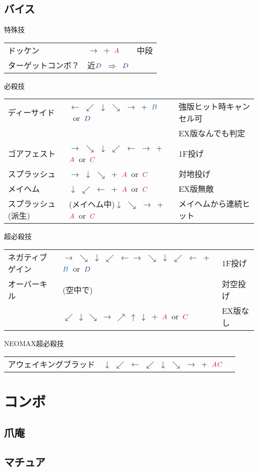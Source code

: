 \documentclass[a4j,11pt]{jarticle}
\def\A{$\textcolor{Acolor}{A}$}
\def\C{$\textcolor{Ccolor}{C}$}
\def\B{$\textcolor{Bcolor}{B}$}
\def\D{$\textcolor{Dcolor}{D}$}
\def\hado{$\downarrow$ $\searrow$ $\rightarrow$}%
\def\tatsu{$\downarrow$ $\swarrow$ $\leftarrow$}%
\def\syoryu{$\rightarrow$ $\downarrow$ $\searrow$}%
\def\yoga{$\leftarrow$ $\swarrow$ $\downarrow$ $\searrow$ $\rightarrow$}%
\def\gyakuyoga{$\rightarrow$ $\searrow$ $\downarrow$ $\swarrow$ $\leftarrow$}%
\def\tenti{$\rightarrow$ $\searrow$ $\downarrow$ $\swarrow$ $\leftarrow$ $\rightarrow$}%
\def\orochi{$\downarrow$ $\swarrow$ $\leftarrow$ $\swarrow$ $\downarrow$ $\searrow$ $\rightarrow$}%
\def\Cancel{$\Longrightarrow$}
\begin{document}
\subsection{バイス}
\begin{itembox}[l]{特殊技}
\begin{tabular}{lll}
ドッケン&$\rightarrow$\ +\ \A&中段\\%
ターゲットコンボ？&近\D\ \Cancel\ \D&%
\end{tabular}
\end{itembox}
\begin{itembox}[l]{必殺技}
\begin{tabular}{lll}
ディーサイド&\yoga\ +\ \B\ or\ \D&強版ヒット時キャンセル可\\
&&EX版なんでも判定\\%
ゴアフェスト&\tenti\ +\ \A\ or\ \C&1F投げ\\%
スプラッシュ&\syoryu\ +\ \A\ or\ \C&対地投げ\\%
メイヘム&\tatsu\ +\ \A\ or\ \C&EX版無敵\\%
スプラッシュ(派生)&(メイヘム中)\hado\ +\ \A\ or\ \C&メイヘムから連続ヒット%
\end{tabular}
\end{itembox}
\begin{itembox}[l]{超必殺技}
\begin{tabular}{lll}
ネガティブゲイン&\gyakuyoga\gyakuyoga\ +\ \B\ or\ \D&1F投げ\\%
オーバーキル&(空中で)&対空投げ \\%
&$\swarrow\ \downarrow\ \searrow\ \rightarrow\ \nearrow\ \uparrow\
\downarrow$\ +\ \A\ or\ \C&EX版なし
\end{tabular}
\end{itembox}
\begin{itembox}[l]{NEOMAX超必殺技}
\begin{tabular}{lll}
アウェイキングブラッド&\orochi\ +\ \A\C&%
\end{tabular}
\end{itembox}
\newpage
\section{コンボ}
\subsection{爪庵}
\subsection{マチュア}
\end{document}
